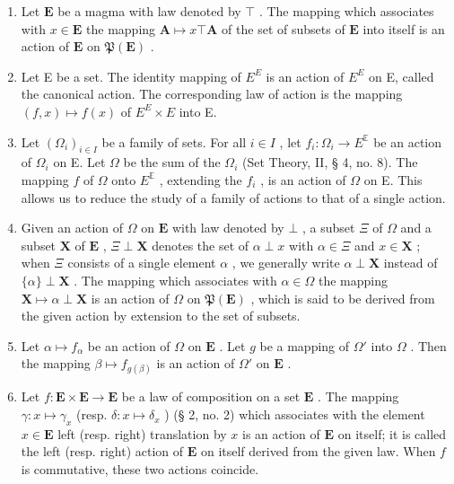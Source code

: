 \begin{enumerate}
\def\labelenumi{(\arabic{enumi})}
\setcounter{enumi}{1}
\item
  Let \(\mathbf{E}\) be a magma with law denoted by \(\top\) . The mapping which associates with \(x \in \mathbf{E}\) the mapping \(\mathbf{A} \mapsto x \top \mathbf{A}\) of the set of subsets of \(\mathbf{E}\) into itself is an action of \(\mathbf{E}\) on \(\mathfrak{P}(\mathbf{E})\) .
\item
  Let E be a set. The identity mapping of \(E^{E}\) is an action of \(E^{E}\) on E, called the canonical action. The corresponding law of action is the mapping \((f, x) \mapsto f(x)\) of \(E^{E} \times E\) into E.
\item
  Let \((\Omega_{i})_{i\in I}\) be a family of sets. For all \(i\in I\) , let \(f_{i}\colon \Omega_{i}\to E^{\mathbb{E}}\) be an action of \(\Omega_{i}\) on E. Let \(\Omega\) be the sum of the \(\Omega_{i}\) (Set Theory, II, § 4, no. 8). The mapping \(f\) of \(\Omega\) onto \(E^{\mathbb{E}}\) , extending the \(f_{i}\) , is an action of \(\Omega\) on E. This allows us to reduce the study of a family of actions to that of a single action.
\item
  Given an action of \(\Omega\) on \(\mathbf{E}\) with law denoted by \(\bot\) , a subset \(\Xi\) of \(\Omega\) and a subset \(\mathbf{X}\) of \(\mathbf{E}\) , \(\Xi \perp \mathbf{X}\) denotes the set of \(\alpha \perp x\) with \(\alpha \in \Xi\) and \(x \in \mathbf{X}\) ; when \(\Xi\) consists of a single element \(\alpha\) , we generally write \(\alpha \perp \mathbf{X}\) instead of \(\{\alpha\} \perp \mathbf{X}\) . The mapping which associates with \(\alpha \in \Omega\) the mapping \(\mathbf{X} \mapsto \alpha \perp \mathbf{X}\) is an action of \(\Omega\) on \(\mathfrak{P}(\mathbf{E})\) , which is said to be derived from the given action by extension to the set of subsets.
\item
  Let \(\alpha \mapsto f_{\alpha}\) be an action of \(\Omega\) on \(\mathbf{E}\) . Let \(g\) be a mapping of \(\Omega'\) into \(\Omega\) . Then the mapping \(\beta \mapsto f_{g(\beta)}\) is an action of \(\Omega'\) on \(\mathbf{E}\) .
\item
  Let \(f: \mathbf{E} \times \mathbf{E} \to \mathbf{E}\) be a law of composition on a set \(\mathbf{E}\) . The mapping \(\gamma: x \mapsto \gamma_x\) (resp. \(\delta: x \mapsto \delta_x\) ) (§ 2, no. 2) which associates with the element \(x \in \mathbf{E}\) left (resp. right) translation by \(x\) is an action of \(\mathbf{E}\) on itself; it is called the left (resp. right) action of \(\mathbf{E}\) on itself derived from the given law. When \(f\) is commutative, these two actions coincide.
\end{enumerate}

